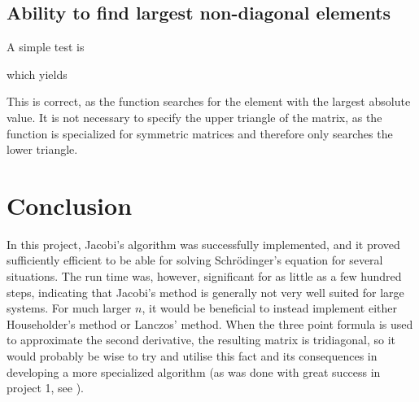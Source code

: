 \documentclass[12pt,english,a4paper]{report}
\begin{document}
\clearpage
\subsection{Ability to find largest non-diagonal elements}
A simple test is

which yields

This is correct, as the function searches for the element with the largest absolute value. It is not necessary to specify the upper triangle of the matrix, as the function is specialized for symmetric matrices and therefore only searches the lower triangle.


%

\section{Conclusion}
In this project, Jacobi's algorithm was successfully implemented, and it proved sufficiently efficient to be able for solving Schrödinger's equation for several situations. The run time was, however, significant for as little as a few hundred steps, indicating that Jacobi's method is generally not very well suited for large systems. For much larger \(n\), it would be beneficial to instead implement either Householder's method or Lanczos' method. When the three point formula is used to approximate the second derivative, the resulting matrix is tridiagonal, so it would probably be wise to try and utilise this fact and its consequences in developing a more specialized algorithm (as was done with great success in project 1, see \autocite{oblig1}).




\clearpage
{}
\printbibliography
\end{document}
